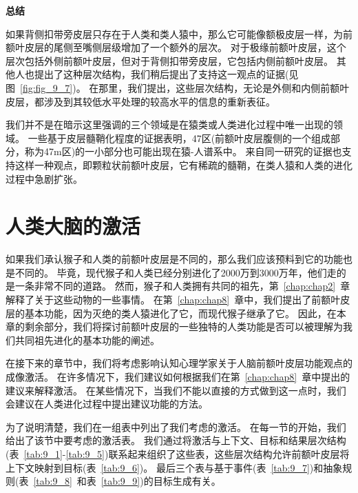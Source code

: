 \textbf{总结}
\par

如果背侧扣带旁皮层只存在于人类和类人猿中，那么它可能像额极皮层一样，为前额叶皮层的尾侧至嘴侧层级增加了一个额外的层次。
对于极缘前额叶皮层，这个层次包括外侧前额叶皮层，但对于背侧扣带旁皮层，它包括内侧前额叶皮层。
其他人也提出了这种层次结构\cite{amodio2006meeting,summerfield2009decision}，我们稍后提出了支持这一观点的证据(见图~\ref{fig:fig_9_7})。
在那里，我们提出，这些层次结构，无论是外侧和内侧前额叶皮层，都涉及到其较低水平处理的较高水平的信息的重新表征。
\par


我们并不是在暗示这里强调的三个领域是在猿类或人类进化过程中唯一出现的领域。
一些基于皮层髓鞘化程度的证据表明，47区(前额叶皮层腹侧的一个组成部分，称为47m区)的一小部分也可能出现在猿-人谱系中\cite{glasser2011comparative}。
来自同一研究的证据也支持这样一种观点，即颗粒状前额叶皮层，它有稀疏的髓鞘，在类人猿和人类的进化过程中急剧扩张。



\section{人类大脑的激活}

如果我们承认猴子和人类的前额叶皮层是不同的，那么我们应该预料到它的功能也是不同的。
毕竟，现代猴子和人类已经分别进化了2000万到3000万年，他们走的是一条非常不同的道路。
然而，猴子和人类拥有共同的祖先，第~\ref{chap:chap2}~章解释了关于这些动物的一些事情。
在第~\ref{chap:chap8}~章中，我们提出了前额叶皮层的基本功能，因为灭绝的类人猿进化了它，而现代猴子继承了它。
因此，在本章的剩余部分，我们将探讨前额叶皮层的一些独特的人类功能是否可以被理解为我们共同祖先进化的基本功能的阐述。
\par


在接下来的章节中，我们将考虑影响认知心理学家关于人脑前额叶皮层功能观点的成像激活。
在许多情况下，我们建议如何根据我们在第~\ref{chap:chap8}~章中提出的建议来解释激活。
在某些情况下，当我们不能以直接的方式做到这一点时，我们会建议在人类进化过程中提出建议功能的方法。
\par


为了说明清楚，我们在一组表中列出了我们考虑的激活。
在每一节的开始，我们给出了该节中要考虑的激活表。
我们通过将激活与上下文、目标和结果层次结构(表~\ref{tab:9_1}-\ref{tab:9_5})联系起来组织了这些表，这些层次结构允许前额叶皮层将上下文映射到目标(表~\ref{tab:9_6})。
最后三个表与基于事件(表~\ref{tab:9_7})和抽象规则(表~\ref{tab:9_8}~和表~\ref{tab:9_9})的目标生成有关。



